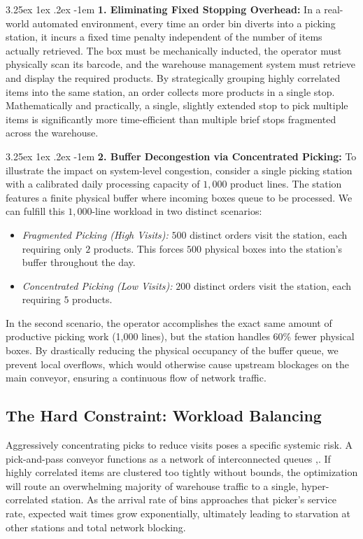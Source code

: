 \documentclass[preprint,review,11pt,authoryear]{elsarticle}
\makeatletter
\renewcommand\paragraph{\@startsection{paragraph}{4}{\z@}
  {3.25ex \@plus1ex \@minus.2ex}
  {-1em}
  {\normalfont\normalsize\itshape}}
\makeatother
\begin{document}
\paragraph{\textbf{1. Eliminating Fixed Stopping Overhead: }}
In a real-world automated environment, every time an order bin diverts into a picking station, it incurs a fixed time penalty independent of the number of items actually retrieved. The box must be mechanically inducted, the operator must physically scan its barcode, and the warehouse management system must retrieve and display the required products. By strategically grouping highly correlated items into the same station, an order collects more products in a single stop. Mathematically and practically, a single, slightly extended stop to pick multiple items is significantly more time-efficient than multiple brief stops fragmented across the warehouse.

\paragraph{\textbf{2. Buffer Decongestion via Concentrated Picking: }}
To illustrate the impact on system-level congestion, consider a single picking station with a calibrated daily processing capacity of $1,000$ product lines. The station features a finite physical buffer where incoming boxes queue to be processed. We can fulfill this $1,000$-line workload in two distinct scenarios:
\begin{itemize}
    \item \textit{Fragmented Picking (High Visits):} $500$ distinct orders visit the station, each requiring only $2$ products. This forces $500$ physical boxes into the station's buffer throughout the day.
    \item \textit{Concentrated Picking (Low Visits):} $200$ distinct orders visit the station, each requiring $5$ products. 
\end{itemize}
In the second scenario, the operator accomplishes the exact same amount of productive picking work (1,000 lines), but the station handles 60\% fewer physical boxes. By drastically reducing the physical occupancy of the buffer queue, we prevent local overflows, which would otherwise cause upstream blockages on the main conveyor, ensuring a continuous flow of network traffic.

\subsection{The Hard Constraint: Workload Balancing}\label{par:balanced_workload} 
Aggressively concentrating picks to reduce visits poses a specific systemic risk. A pick-and-pass conveyor functions as a network of interconnected queues \cite{kim2020},\cite{tarczynski2023}. If highly correlated items are clustered too tightly without bounds, the optimization will route an overwhelming majority of warehouse traffic to a single, hyper-correlated station. As the arrival rate of bins approaches that picker's service rate, expected wait times grow exponentially, ultimately leading to starvation at other stations and total network blocking.
\end{document}
